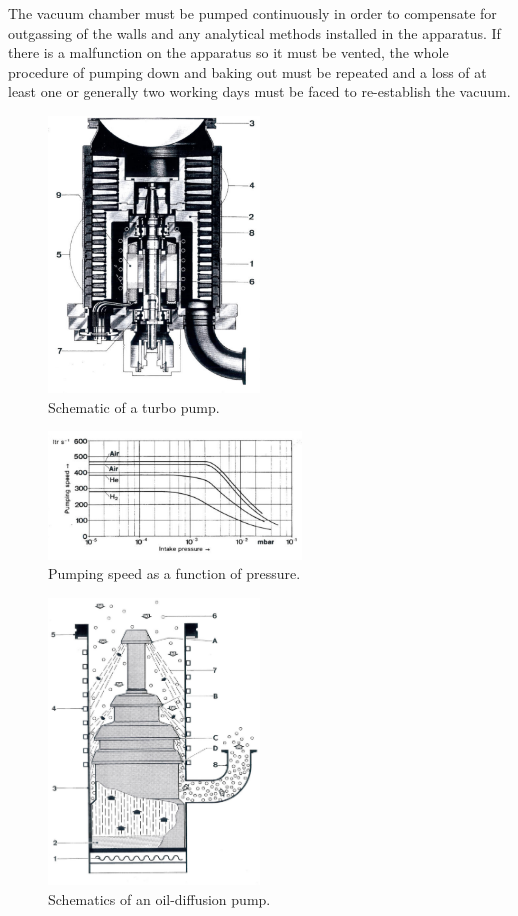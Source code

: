 The vacuum chamber must be pumped continuously in order to compensate for outgassing of the walls and any analytical methods installed in the apparatus. If there is a malfunction on the apparatus so it must be vented, the whole procedure of pumping down and baking out must be repeated and a loss of at least one or generally two working days must be faced to re-establish the vacuum.

\begin{figure}[htbp]
\centering
\includegraphics[width=0.5\textwidth]{figures/02_01a}
\caption{Schematic of a turbo pump.}
\label{fig:turbo_pump}
\end{figure}

\begin{figure}[htbp]
\centering
\includegraphics[width=0.6\textwidth]{figures/02_01b}
\caption{Pumping speed as a function of pressure.}
\label{fig:pumping_speed}
\end{figure}

\begin{figure}[htbp]
\centering
\includegraphics[width=0.5\textwidth]{figures/02_02}
\caption{Schematics of an oil-diffusion pump.}
\label{fig:oildiffusion_pump}
\end{figure}

